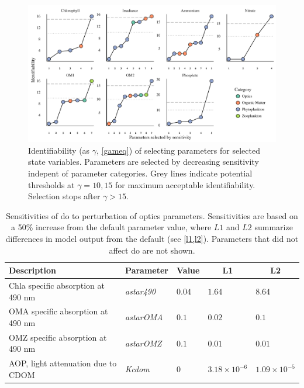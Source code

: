 \documentclass[letterpaper,12pt,oneside]{article}\usepackage[]{graphicx}\usepackage[]{color}
\begin{document}
\begin{figure}[!ht]

{\centering \includegraphics[width=\textwidth]{figs/heurist_stts-1} 

}

\caption[Identifiability (as ]{Identifiability (as $\gamma$, \cref{gameq}) of selecting parameters for selected state variables. Parameters are selected by decreasing sensitivity indepent of parameter categories. Grey lines indicate potential thresholds at $\gamma = 10, 15$ for maximum acceptable identifiability. Selection stops after $\gamma > 15$.}\label{fig:heurist_stts}
\end{figure}



\clearpage

\begin{table}[!tbp]
{\normalsize
\caption{Sensitivities of \ac{do} to perturbation of optics parameters.  Sensitivities are based on a 50\% increase from the default parameter value, where $L1$ and $L2$ summarize differences in model output from the default (see \cref{l1,l2}).  Parameters that did not affect \ac{do} are not shown.\label{tab:optsens}} 
\begin{center}
\begin{tabular}{lllll}
\hline\hline
\multicolumn{1}{l}{Description}&\multicolumn{1}{c}{Parameter}&\multicolumn{1}{c}{Value}&\multicolumn{1}{c}{L1}&\multicolumn{1}{c}{L2}\tabularnewline
\hline
Chla specific absorption at 490 nm&\textit{astar490}&$0.04$&$1.64$&$8.64$\tabularnewline
OMA specific absorption at 490 nm&\textit{astarOMA}&$0.1$&$0.02$&$0.1$\tabularnewline
OMZ specific absorption at 490 nm&\textit{astarOMZ}&$0.1$&$0.01$&$0.01$\tabularnewline
AOP, light attenuation due to CDOM&\textit{Kcdom}&$0$&$3.18\times 10^{-6}$&$1.09\times 10^{-5}$\tabularnewline
\hline
\end{tabular}\end{center}}

\end{table}
\end{document}

